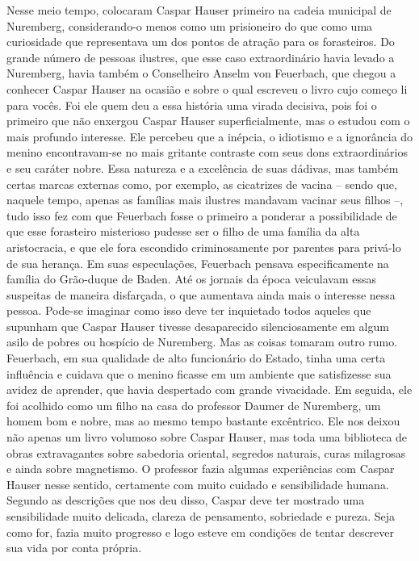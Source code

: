 Nesse meio tempo, colocaram Caspar Hauser primeiro na cadeia municipal
de Nuremberg, considerando-o menos como um prisioneiro do que como uma
curiosidade que representava um dos pontos de atração para os
forasteiros. Do grande número de pessoas ilustres, que esse caso
extraordinário havia levado a Nuremberg, havia também o Conselheiro
Anselm von Feuerbach, que chegou a conhecer Caspar Hauser na ocasião e
sobre o qual escreveu o livro cujo começo li para vocês. Foi ele quem
deu a essa história uma virada decisiva, pois foi o primeiro que não
enxergou Caspar Hauser superficialmente, mas o estudou com o mais
profundo interesse. Ele percebeu que a inépcia, o idiotismo e a
ignorância do menino encontravam-se no mais gritante contraste com seus
dons extraordinários e seu caráter nobre. Essa natureza e a excelência
de suas dádivas, mas também certas marcas externas como, por exemplo, as
cicatrizes de vacina -- sendo que, naquele tempo, apenas as famílias
mais ilustres mandavam vacinar seus filhos --, tudo isso fez com que
Feuerbach fosse o primeiro a ponderar a possibilidade de que esse
forasteiro misterioso pudesse ser o filho de uma família da alta
aristocracia, e que ele fora escondido criminosamente por parentes para
privá-lo de sua herança. Em suas especulações, Feuerbach pensava
especificamente na família do Grão-duque de Baden. Até os jornais da
época veiculavam essas suspeitas de maneira disfarçada, o que aumentava
ainda mais o interesse nessa pessoa. Pode-se imaginar como isso deve ter
inquietado todos aqueles que supunham que Caspar Hauser tivesse
desaparecido silenciosamente em algum asilo de pobres ou hospício de
Nuremberg. Mas as coisas tomaram outro rumo. Feuerbach, em sua qualidade
de alto funcionário do Estado, tinha uma certa influência e cuidava que
o menino ficasse em um ambiente que satisfizesse sua avidez de aprender,
que havia despertado com grande vivacidade. Em seguida, ele foi acolhido
como um filho na casa do professor Daumer de Nuremberg, um homem bom e
nobre, mas ao mesmo tempo bastante excêntrico. Ele nos deixou não apenas
um livro volumoso sobre Caspar Hauser, mas toda uma biblioteca de obras
extravagantes sobre sabedoria oriental, segredos naturais, curas
milagrosas e ainda sobre magnetismo. O professor fazia algumas
experiências com Caspar Hauser nesse sentido, certamente com muito
cuidado e sensibilidade humana. Segundo as descrições que nos deu disso,
Caspar deve ter mostrado uma sensibilidade muito delicada, clareza de
pensamento, sobriedade e pureza. Seja como for, fazia muito progresso e
logo esteve em condições de tentar descrever sua vida por conta própria.
